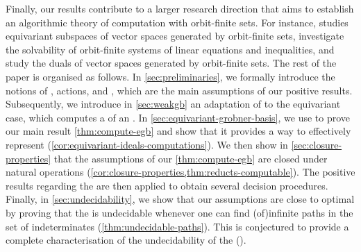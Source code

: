 Finally, our results contribute to a larger research direction that aims to
establish an algorithmic theory of computation with orbit-finite sets. For
instance, \cite{BFKM24} studies equivariant subspaces of vector spaces
generated by orbit-finite sets, \cite{GHL22,GHL25} investigate the solvability of
orbit-finite systems of linear equations and inequalities, and
\cite{BFKM24,GHL22,Prz23} study the duals of vector spaces generated by
orbit-finite sets.
%
 \AP The rest of the paper is organised as follows. In
\cref{sec:preliminaries}, we formally introduce the notions of ,  actions, and ,
which are the main assumptions of our positive results. Subsequently, we
introduce in \cref{sec:weakgb} an adaptation of  to
the equivariant case, which computes a  of an
. In \cref{sec:equivariant-grobner-basis}, we use
 to prove our main result \cref{thm:compute-egb}
and show that it provides a way to effectively represent 
(\cref{cor:equivariant-ideals-computations}). We then show in \cref{sec:closure-properties}
that the assumptions of our \cref{thm:compute-egb} are closed under natural operations
(\cref{cor:closure-properties,thm:reducts-computable}). The positive results
regarding the  are then applied to
obtain several decision procedures. Finally, in \cref{sec:undecidability}, we
show that our assumptions are close to optimal by proving that the
 is undecidable whenever one can find
\kl(of){infinite paths} in the set of indeterminates
(\cref{thm:undecidable-paths}).
This is conjectured to provide a
complete characterisation of the undecidability of the  ().
